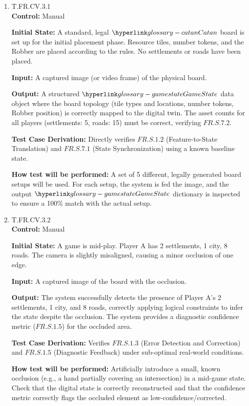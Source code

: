 \documentclass[12pt, titlepage]{article}
\begin{document}
\begin{enumerate}

\item{T.FR.CV.3.1\\}
\textbf{Control:} Manual

\textbf{Initial State:} A standard, legal $\Catan{}$ board is set up for the initial placement phase. Resource tiles, number tokens, and the Robber are placed according to the rules. No settlements or roads have been placed.

\textbf{Input:} A captured image (or video frame) of the physical board.

\textbf{Output:} A structured $\GameState{}$ data object where the board topology (tile types and locations, number tokens, Robber position) is correctly mapped to the digital twin. The asset counts for all players (settlements: 5, roads: 15) must be correct, verifying $\hyperref[FR.S.7.2]{FR.S.7.2}$.

\textbf{Test Case Derivation:} Directly verifies $\hyperref[FR.S.1.2]{FR.S.1.2}$ (Feature-to-State Translation) and $\hyperref[FR.S.7.1]{FR.S.7.1}$ (State Synchronization) using a known baseline state.

\textbf{How test will be performed:} A set of 5 different, legally generated board setups will be used. For each setup, the system is fed the image, and the output $\GameState{}$ dictionary is inspected to ensure a 100\% match with the actual setup.

\item{T.FR.CV.3.2\\}
\textbf{Control:} Manual

\textbf{Initial State:} A game is mid-play. Player A has 2 settlements, 1 city, 8 roads. The camera is slightly misaligned, causing a minor occlusion of one edge.

\textbf{Input:} A captured image of the board with the occlusion.

\textbf{Output:} The system successfully detects the presence of Player A's 2 settlements, 1 city, and 8 roads, correctly applying logical constraints to infer the state despite the occlusion. The system provides a diagnostic confidence metric ($\hyperref[FR.S.1.5]{FR.S.1.5}$) for the occluded area.

\textbf{Test Case Derivation:} Verifies $\hyperref[FR.S.1.3]{FR.S.1.3}$ (Error Detection and Correction) and $\hyperref[FR.S.1.5]{FR.S.1.5}$ (Diagnostic Feedback) under sub-optimal real-world conditions.

\textbf{How test will be performed:} Artificially introduce a small, known occlusion (e.g., a hand partially covering an intersection) in a mid-game state. Check that the digital state is correctly reconstructed and that the confidence metric correctly flags the occluded element as low-confidence/corrected.



\end{enumerate}
\end{document}
